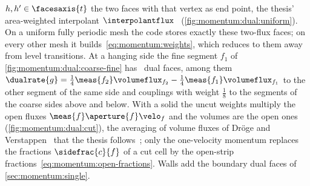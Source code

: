 $h,h'\in\facesaxis{t}$ the two faces with that vertex as end point, the
thesis' area-weighted interpolant $\interpolantflux$~
(\cref{fig:momentum:dual:uniform}). On a uniform fully periodic mesh the code
stores exactly these two-flux faces; on every other mesh it
builds~\cref{eq:momentum:weights}, which reduces to them away from level
transitions. At a hanging side the fine segment $f_1$ of
\cref{fig:momentum:dual:coarse-fine} has \chkMomCoarseLinks\ dual faces,
among them $\dualrate{g}=\tfrac14\meas{f_2}\volumeflux_{f_2}-\tfrac14\meas{f_1}\volumeflux_{f_1}$
to the other segment of the same side and couplings with weight
$\frac18$ to the segments of the coarse sides above and below. With a solid
the uncut weights multiply the open fluxes $\meas{f}\aperture{f}\velo_f$
and the volumes are the open ones (\cref{fig:momentum:dual:cut}), the
averaging of volume fluxes of Dröge and Verstappen~\cite{droge2005} that the
thesis follows~; only the one-velocity momentum replaces the
fractions $\sidefrac{c}{f}$ of a cut cell by the open-strip
fractions~\cref{eq:momentum:open-fractions}. Walls add the boundary dual faces
of \cref{sec:momentum:single}.



